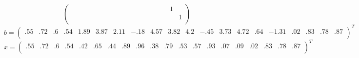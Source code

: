 \begin{tiny}
\[\begin{pmatrix}
    &   &   &   &   &   &   &   &   &   &   &   &   &   &   &   &   &   & 1 &  \\
    &   &   &   &   &   &   &   &   &   &   &   &   &   &   &   &   &   &   & 1\\
\end{pmatrix} \]
\[ b = \begin{pmatrix}
   .55 &  .72 &  .6 &  .54 & 1.89 & 3.87 & 2.11 & - .18 & 4.57 & 3.82 & 4.2 & - .45 & 3.73 & 4.72 &  .64 & -1.31 &  .02 &  .83 &  .78 &  .87\\
\end{pmatrix}^{T} \]
\[ x = \begin{pmatrix}
   .55 &  .72 &  .6 &  .54 &  .42 &  .65 &  .44 &  .89 &  .96 &  .38 &  .79 &  .53 &  .57 &  .93 &  .07 &  .09 &  .02 &  .83 &  .78 &  .87\\
\end{pmatrix}^{T} \]
\end{tiny}

